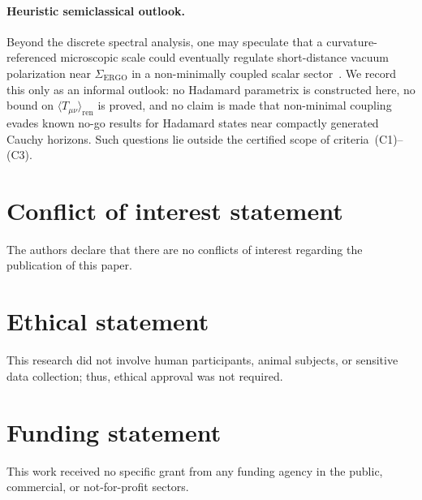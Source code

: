 \documentclass{iopjournal}
\newcommand{\Tmn}{T_{\mu\nu}}
\theoremstyle{remark}
\begin{document}
\paragraph{Heuristic semiclassical outlook.}
Beyond the discrete spectral analysis, one may speculate that a curvature-referenced microscopic scale could eventually regulate short-distance vacuum polarization near $\Sigma_{\mathrm{ERGO}}$ in a non-minimally coupled scalar sector~\cite{KimThorne1991,Hawking1992,KayRadzikowskiWald1997}.
We record this only as an informal outlook: no Hadamard parametrix is constructed here, no bound on $\langle\Tmn\rangle_{\mathrm{ren}}$ is proved, and no claim is made that non-minimal coupling evades known no-go results for Hadamard states near compactly generated Cauchy horizons.
Such questions lie outside the certified scope of criteria~(C1)--(C3).

\section*{Conflict of interest statement}
The authors declare that there are no conflicts of interest regarding the publication of this paper.

\section*{Ethical statement}
This research did not involve human participants, animal subjects, or sensitive data collection; thus, ethical approval was not required.

\section*{Funding statement}
This work received no specific grant from any funding agency in the public, commercial, or not-for-profit sectors.



\end{document}
